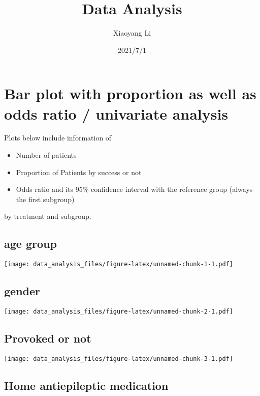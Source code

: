 \documentclass[
]{article}
\title{Data Analysis}
\author{Xiaoyang Li}
\date{2021/7/1}
\providecommand{\tightlist}{%
  \setlength{\itemsep}{0pt}\setlength{\parskip}{0pt}}
\begin{document}
\maketitle

\hypertarget{bar-plot-with-proportion-as-well-as-odds-ratio-univariate-analysis}{%
\section{Bar plot with proportion as well as odds ratio / univariate
analysis}\label{bar-plot-with-proportion-as-well-as-odds-ratio-univariate-analysis}}

Plots below include information of

\begin{itemize}
\tightlist
\item
  Number of patients
\item
  Proportion of Patients by success or not
\item
  Odds ratio and its 95\% confidence interval with the reference group
  (always the first subgroup)
\end{itemize}

by treatment and subgroup.

\hypertarget{age-group}{%
\subsection{age group}\label{age-group}}

\texttt{[image: data\_analysis\_files/figure-latex/unnamed-chunk-1-1.pdf]}

\hypertarget{gender}{%
\subsection{gender}\label{gender}}

\texttt{[image: data\_analysis\_files/figure-latex/unnamed-chunk-2-1.pdf]}

\hypertarget{provoked-or-not}{%
\subsection{Provoked or not}\label{provoked-or-not}}

\texttt{[image: data\_analysis\_files/figure-latex/unnamed-chunk-3-1.pdf]}

\hypertarget{home-antiepileptic-medication}{%
\subsection{Home antiepileptic
medication}\label{home-antiepileptic-medication}}
\end{document}
